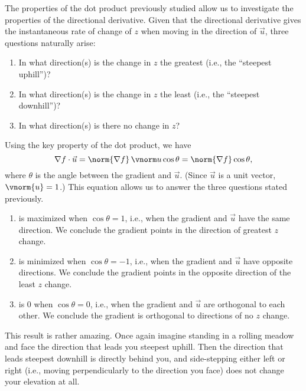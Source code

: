 The properties of the dot product previously studied allow us to investigate the properties of the directional derivative. Given that the directional derivative gives the instantaneous rate of change of $z$ when moving in the direction of $\vec u$, three questions naturally arise:
\begin{enumerate}
	\item In what direction(s) is the change in $z$ the greatest (i.e., the ``steepest uphill'')?
	\item In what direction(s) is the change in $z$ the least (i.e.,  the ``steepest downhill'')?
	\item In what direction(s) is there no change in $z$?
\end{enumerate}

Using the key property of the dot product, we have
\begin{equation}\nabla f\cdot \vec u = \norm{\nabla f}\,\vnorm u \cos \theta = \norm{\nabla f}\cos \theta, \label{eq:gradient}\end{equation}
where $\theta$ is the angle between the gradient and $\vec u$. (Since $\vec u$ is a unit vector, $\vnorm{u} = 1$.) This equation allows us to answer the three questions stated previously.

\begin{enumerate}
	\item {} is maximized when $\cos \theta =1$, i.e., when the gradient and $\vec u$ have the same direction. We conclude the gradient points in the direction of greatest $z$ change.
	\item	{} is minimized when $\cos \theta = -1$, i.e., when the gradient and $\vec u$ have opposite directions. We conclude the gradient points in the opposite direction of the least $z$ change.
	\item {} is 0 when $\cos \theta = 0$, i.e., when the gradient and $\vec u$ are orthogonal to each other. We conclude the gradient is orthogonal to directions of no $z$ change. 
\end{enumerate}

This result is rather amazing. Once again imagine standing in a rolling meadow and face the  direction that leads you steepest uphill. Then the direction that leads steepest downhill is directly behind you, and side-stepping either left or right (i.e., moving perpendicularly to the direction you face) does not change your elevation at all.


